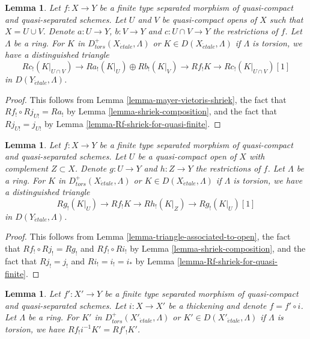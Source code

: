 \documentclass{stacks-project}
\theoremstyle{plain}
\newtheorem{lemma}[subsection]{Lemma}
\theoremstyle{definition}
\theoremstyle{remark}
\numberwithin{equation}{subsection}
\def\etale{{\acute{e}tale}}
\begin{document}
\begin{lemma}
\label{lemma-relative-mayer-vietoris}
Let $f : X \to Y$ be a finite type separated morphism of quasi-compact and
quasi-separated schemes. Let $U$ and $V$ be quasi-compact opens of $X$
such that $X = U \cup V$. Denote $a : U \to Y$, $b : V \to Y$ and
$c : U \cap V \to Y$ the restrictions of $f$. Let $\Lambda$ be a ring.
For $K$ in $D^+_{tors}(X_\etale, \Lambda)$ or $K \in D(X_\etale, \Lambda)$
if $\Lambda$ is torsion, we have a distinguished triangle
$$
Rc_!(K|_{U \cap V}) \to
Ra_!(K|_U) \oplus Rb_!(K|_V) \to
Rf_!K \to 
Rc_!(K|_{U \cap V})[1]
$$
in $D(Y_\etale, \Lambda)$.
\end{lemma}

\begin{proof}
This follows from Lemma \ref{lemma-mayer-vietoris-shriek},
the fact that $Rf_! \circ Rj_{U!} = Ra_!$ by
Lemma \ref{lemma-shriek-composition}, and the fact that
$Rj_{U!} = j_{U!}$ by Lemma \ref{lemma-Rf-shriek-for-quasi-finite}.
\end{proof}

\begin{lemma}
\label{lemma-relative-triangle-associated-to-open}
Let $f : X \to Y$ be a finite type separated morphism of quasi-compact and
quasi-separated schemes. Let $U$ be a quasi-compact open of $X$ with
complement $Z \subset X$.  Denote $g : U \to Y$ and $h : Z \to Y$
the restrictions of $f$. Let $\Lambda$ be a ring.
For $K$ in $D^+_{tors}(X_\etale, \Lambda)$ or $K \in D(X_\etale, \Lambda)$
if $\Lambda$ is torsion, we have a distinguished triangle
$$
Rg_!(K|_U) \to
Rf_!K \to
Rh_!(K|_Z) \to
Rg_!(K|_U)[1]
$$
in $D(Y_\etale, \Lambda)$.
\end{lemma}

\begin{proof}
This follows from
Lemma \ref{lemma-triangle-associated-to-open},
the fact that $Rf_! \circ Rj_! = Rg_!$ and $Rf_! \circ Ri_!$ by
Lemma \ref{lemma-shriek-composition}, and the fact that
$Rj_! = j_!$ and $Ri_! = i_! = i_*$ by
Lemma \ref{lemma-Rf-shriek-for-quasi-finite}.
\end{proof}

\begin{lemma}
\label{lemma-shriek-and-thickening}
Let $f' : X' \to Y$ be a finite type separated morphism of quasi-compact and
quasi-separated schemes. Let $i : X \to X'$ be a thickening and
denote $f = f' \circ i$. Let $\Lambda$ be a ring.
For $K'$ in $D^+_{tors}(X'_\etale, \Lambda)$ or $K' \in D(X'_\etale, \Lambda)$
if $\Lambda$ is torsion, we have $Rf_!i^{-1}K' = Rf'_!K'$.
\end{lemma}
\end{document}

